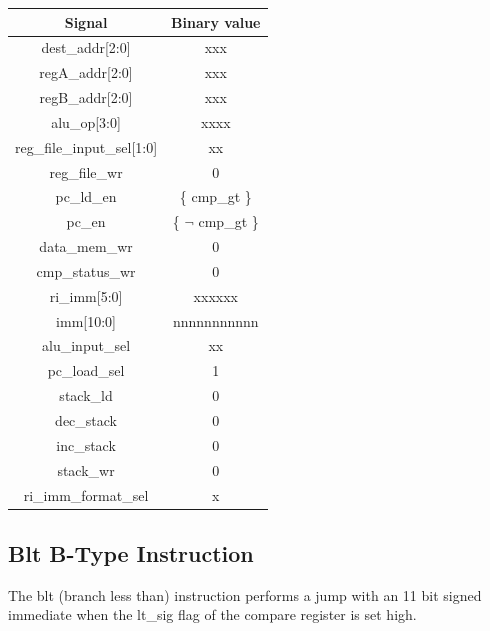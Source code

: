 \documentclass{article}
\begin{document}
\begin{par}
	\begin{center}
		\begin{tabular}{|c|c|}
			\hline 
			\textbf{Signal} & \textbf{Binary value} \\ 
			\hline 
			dest\_addr[2:0] & xxx \\ 
			\hline 
			regA\_addr[2:0] & xxx \\ 
			\hline 
			regB\_addr[2:0] & xxx \\ 
			\hline 
			alu\_op[3:0] & xxxx \\ 
			\hline 
			reg\_file\_input\_sel[1:0] & xx \\ 
			\hline 
			reg\_file\_wr & 0 \\ 
			\hline 
			pc\_ld\_en & \{ cmp\_gt \} \\ 
			\hline 
			pc\_en & \{ $ \lnot $ cmp\_gt \} \\ 
			\hline 
			data\_mem\_wr & 0 \\ 
			\hline 
			cmp\_status\_wr & 0 \\ 
			\hline 
			ri\_imm[5:0] & xxxxxx \\ 
			\hline 
			imm[10:0] & nnnnnnnnnnn \\ 
			\hline 
			alu\_input\_sel & xx \\ 
			\hline 
			pc\_load\_sel & 1 \\ 
			\hline 
			stack\_ld & 0 \\ 
			\hline 
			dec\_stack & 0 \\ 
			\hline 
			inc\_stack & 0 \\ 
			\hline 
			stack\_wr & 0 \\ 
			\hline 
			ri\_imm\_format\_sel & x \\ 
			\hline 
		\end{tabular} 
	\end{center}

	\newpage
	\subsection{Blt B-Type Instruction}
	
	The blt (branch less than) instruction performs a jump with an 11 bit signed immediate when the lt\_sig flag of the compare register is set high. 
	

\end{par}
\end{document}
